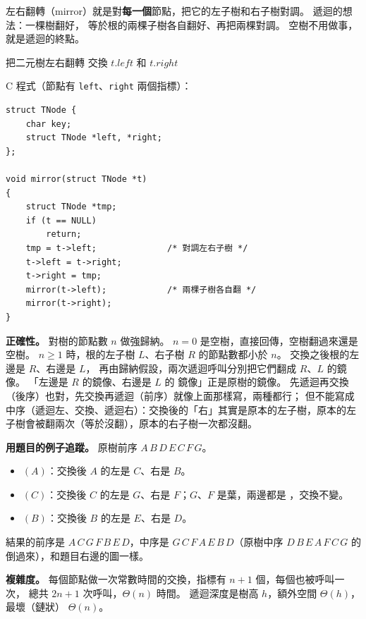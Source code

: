 \begin{pastsoln}
左右翻轉（mirror）就是對\textbf{每一個}節點，把它的左子樹和右子樹對調。 遞迴的想法：一棵樹翻好，
等於根的兩棵子樹各自翻好、再把兩棵對調。 空樹不用做事，就是遞迴的終點。

\begin{pseudo}[unbreakable]{把二元樹左右翻轉}
        \State \Return
    \EndIf
    \State 交換 $t.\mathit{left}$ 和 $t.\mathit{right}$
    \State {}
    \State {}
\EndProcedure
\end{pseudo}

C 程式（節點有 \texttt{left}、\texttt{right} 兩個指標）：
\begin{verbatim}
struct TNode {
    char key;
    struct TNode *left, *right;
};

void mirror(struct TNode *t)
{
    struct TNode *tmp;
    if (t == NULL)
        return;
    tmp = t->left;              /* 對調左右子樹 */
    t->left = t->right;
    t->right = tmp;
    mirror(t->left);            /* 兩棵子樹各自翻 */
    mirror(t->right);
}
\end{verbatim}

\textbf{正確性。} 對樹的節點數 $n$ 做強歸納。 $n = 0$ 是空樹，直接回傳，空樹翻過來還是空樹。
$n \ge 1$ 時，根的左子樹 $L$、右子樹 $R$ 的節點數都小於 $n$。 交換之後根的左邊是 $R$、右邊是 $L$，
再由歸納假設，兩次遞迴呼叫分別把它們翻成 $R$、$L$ 的鏡像。 「左邊是 $R$ 的鏡像、右邊是 $L$ 的
鏡像」正是原樹的鏡像。 先遞迴再交換（後序）也對，先交換再遞迴（前序）就像上面那樣寫，兩種都行；
但不能寫成中序（遞迴左、交換、遞迴右）：交換後的「右」其實是原本的左子樹，原本的左子樹會被翻兩次（等於沒翻），原本的右子樹一次都沒翻。

\textbf{用題目的例子追蹤。} 原樹前序 $A\,B\,D\,E\,C\,F\,G$。
\begin{itemize}
\item {}$(A)$：交換後 $A$ 的左是 $C$、右是 $B$。
\item {}$(C)$：交換後 $C$ 的左是 $G$、右是 $F$；$G$、$F$ 是葉，兩邊都是 \NIL，交換不變。
\item {}$(B)$：交換後 $B$ 的左是 $E$、右是 $D$。
\end{itemize}
結果的前序是 $A\,C\,G\,F\,B\,E\,D$，中序是 $G\,C\,F\,A\,E\,B\,D$（原樹中序 $D\,B\,E\,A\,F\,C\,G$ 的
倒過來），和題目右邊的圖一樣。

\textbf{複雜度。} 每個節點做一次常數時間的交換，\NIL 指標有 $n + 1$ 個，每個也被呼叫一次，
總共 $2n + 1$ 次呼叫，$\Theta(n)$ 時間。 遞迴深度是樹高 $h$，額外空間 $\Theta(h)$，最壞（鏈狀）
$\Theta(n)$。
\end{pastsoln}
